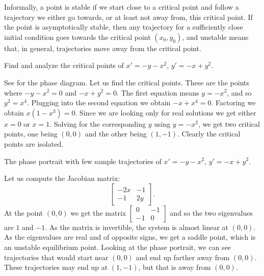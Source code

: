 Informally, a point is stable if we start close to a critical point and
follow a trajectory we either go towards, or at least not away
from, this critical point. If the point is asymptotically stable, then 
any trajectory for a sufficiently close initial condition
goes towards the critical point $(x_0,y_0)$, and unstable means that, in general, trajectories move away from the critical point. 

\begin{example} \label{example:nlin-xplusy}
Find and analyze the critical points of 
$x'=-y-x^2$,
$y'=-x+y^2$.
\end{example}

\begin{exampleSol}
See  for the phase diagram.
Let us find the critical points.  These are the points where
$-y-x^2 = 0$ and $-x+y^2=0$.  The first equation means $y = -x^2$, and
so $y^2 = x^4$.  Plugging into the second equation we obtain 
$-x+x^4 = 0$.  Factoring we obtain $x(1-x^3)=0$.  Since we are looking only
for real solutions we get either $x=0$ or $x=1$.  Solving for the
corresponding $y$ using $y = -x^2$, we get two critical points, one being $(0,0)$
and the other being $(1,-1)$.  Clearly the critical points are isolated.

\begin{myfig}
\capstart
{}
\caption{The phase portrait with few sample trajectories of 
$x'=-y-x^2$, $y'=-x+y^2$.  \label{fig:nlin-ex813-new}}
\end{myfig}


Let us compute the Jacobian matrix:
\begin{equation*}
\begin{bmatrix}
-2x & -1 \\
-1 & 2y
\end{bmatrix} .
\end{equation*}
At the point $(0,0)$ we get the matrix
$\left[ \begin{smallmatrix} 0 & -1 \\ -1 & 0 \end{smallmatrix} \right]$ and
so the two eigenvalues are $1$ and $-1$.  As the matrix is invertible, the system is almost linear
at $(0,0)$.  As the eigenvalues are real
and of opposite signs, we get a saddle point, which is an unstable
equilibrium point. Looking at the phase portrait, we can see trajectories that would start near $(0,0)$ and end up farther away from $(0,0)$. These trajectories may end up at $(1,-1)$, but that is away from $(0,0)$. 


\end{exampleSol}
